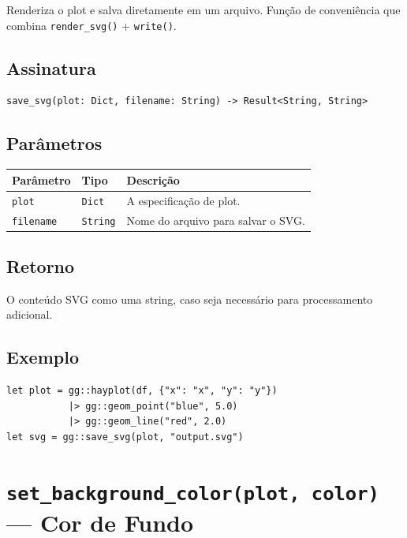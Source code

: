 \documentclass[12pt, a4paper, oneside]{book}
\newcommand{\code}[1]{\texttt{#1}}
\begin{document}
Renderiza o plot e salva diretamente em um arquivo. Função de conveniência que combina \code{render\_svg()} + \code{write()}.

\subsection*{Assinatura}

\begin{lstlisting}[style=inline]
save_svg(plot: Dict, filename: String) -> Result<String, String>
\end{lstlisting}

\subsection*{Parâmetros}

\begin{tabularx}{\textwidth}{@{}lL{2.5cm}X@{}}
  \toprule
  \textbf{Parâmetro} & \textbf{Tipo} & \textbf{Descrição} \\
  \midrule
  \code{plot}     & \code{Dict}   & A especificação de plot. \\[4pt]
  \code{filename} & \code{String} & Nome do arquivo para salvar o SVG. \\
  \bottomrule
\end{tabularx}

\subsection*{Retorno}

O conteúdo SVG como uma string, caso seja necessário para processamento adicional.

\subsection*{Exemplo}

\begin{lstlisting}[caption={Salvamento em um passo}]
let plot = gg::hayplot(df, {"x": "x", "y": "y"})
           |> gg::geom_point("blue", 5.0)
           |> gg::geom_line("red", 2.0)
let svg = gg::save_svg(plot, "output.svg")
\end{lstlisting}

\section{\texttt{set\_background\_color(plot, color)} --- Cor de Fundo}
\end{document}
